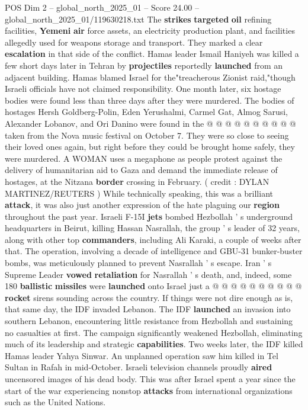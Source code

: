 \begin{textsample}{POS Dim 2 – global\_north\_2025\_01 – Score 24.00 – global\_north\_2025\_01/119630218.txt}
The \textbf{strikes} \textbf{targeted} \textbf{oil} refining facilities, \textbf{Yemeni} \textbf{air} force assets, an electricity production plant, and facilities allegedly used for weapons storage and transport.
They marked a clear \textbf{escalation} in that side of the conflict.
Hamas leader Ismail Haniyeh was killed a few short days later in Tehran by \textbf{projectiles} reportedly \textbf{launched} from an adjacent building.
Hamas blamed Israel for the"treacherous Zionist raid,"though Israeli officials have not claimed responsibility.
One month later, six hostage bodies were found less than three days after they were murdered.
The bodies of hostages Hersh Goldberg-Polin, Eden Yerushalmi, Carmel Gat, Almog Sarusi, Alexander Lobanov, and Ori Danino were found in the @ @ @ @ @ @ @ @ @ @ taken from the Nova music festival on October 7.
They were so close to seeing their loved ones again, but right before they could be brought home safely, they were murdered.
A WOMAN uses a megaphone as people protest against the delivery of humanitarian aid to Gaza and demand the immediate release of hostages, at the Nitzana \textbf{border} crossing in February. ( credit : DYLAN MARTINEZ/REUTERS ) While technically speaking, this was a brilliant \textbf{attack}, it was also just another expression of the hate plaguing our \textbf{region} throughout the past year.
Israeli F-15I \textbf{jets} bombed Hezbollah ' s underground headquarters in Beirut, killing Hassan Nasrallah, the group ' s leader of 32 years, along with other top \textbf{commanders}, including Ali Karaki, a couple of weeks after that.
The operation, involving a decade of intelligence and GBU-31 bunker-buster bombs, was meticulously planned to prevent Nasrallah ' s escape.
Iran ' s Supreme Leader \textbf{vowed} \textbf{retaliation} for Nasrallah ' s death, and, indeed, some 180 \textbf{ballistic} \textbf{missiles} were \textbf{launched} onto Israel just a @ @ @ @ @ @ @ @ @ @ \textbf{rocket} sirens sounding across the country.
If things were not dire enough as is, that same day, the IDF invaded Lebanon.
The IDF \textbf{launched} an invasion into southern Lebanon, encountering little resistance from Hezbollah and sustaining no casualties at first.
The campaign significantly weakened Hezbollah, eliminating much of its leadership and strategic \textbf{capabilities}.
Two weeks later, the IDF killed Hamas leader Yahya Sinwar.
An unplanned operation saw him killed in Tel Sultan in Rafah in mid-October.
Israeli television channels proudly \textbf{aired} uncensored images of his dead body.
This was after Israel spent a year since the start of the war experiencing nonstop \textbf{attacks} from international organizations such as the United Nations.

\end{textsample}
